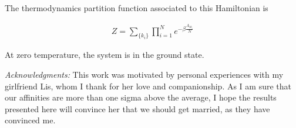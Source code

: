 \documentclass[12pt]{article}
\begin{document}
\noindent The thermodynamics partition function associated to this Hamiltonian is

\begin{align}
    Z=\sum_{\{k_i\}}\prod_{i=1}^Ne^{-\beta \frac{A_{ik_i}}{N}}
\end{align}

At zero temperature, the system is in the ground state.


\vspace{5mm}
\noindent
\textit{Acknowledgments:} This work was motivated by personal experiences with my girlfriend Lis, whom I thank for her love and companionship. As I am sure that our affinities are more than one sigma above the average, I hope the results presented here will convince her that we should get married, as they have convinced me.

\newpage


\end{document}
